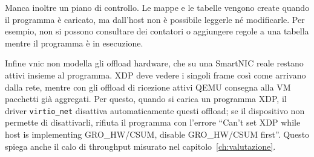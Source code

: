 Manca inoltre un piano di controllo. Le mappe e le tabelle vengono create quando il programma è caricato, ma dall'host non è possibile leggerle né modificarle. Per esempio, non si possono consultare dei contatori o aggiungere regole a una tabella mentre il programma è in esecuzione.

Infine vnic non modella gli offload hardware, che su una SmartNIC reale restano attivi insieme al programma. XDP deve vedere i singoli frame così come arrivano dalla rete, mentre con gli offload di ricezione attivi QEMU consegna alla VM pacchetti già aggregati. Per questo, quando si carica un programma XDP, il driver \texttt{virtio\_net} disattiva automaticamente questi offload; se il dispositivo non permette di disattivarli, rifiuta il programma con l'errore ``Can't set XDP while host is implementing GRO\_HW/CSUM, disable GRO\_HW/CSUM first''. Questo spiega anche il calo di throughput misurato nel capitolo~\ref{ch:valutazione}.
